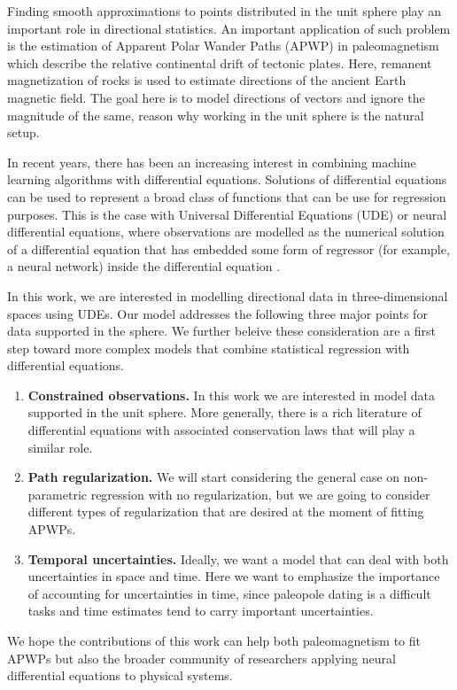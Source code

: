 Finding smooth approximations to points distributed in the unit sphere play an important role in directional statistics. 
An important application of such problem is the estimation of Apparent Polar Wander Paths (APWP) in paleomagnetism which describe the relative continental drift of tectonic plates.
Here, remanent magnetization of rocks is used to estimate directions of the ancient Earth magnetic field. 
The goal here is to model directions of vectors and ignore the magnitude of the same, reason why working in the unit sphere is the natural setup. 

In recent years, there has been an increasing interest in combining machine learning algorithms with differential equations. 
Solutions of differential equations can be used to represent a broad class of functions that can be use for regression purposes. 
This is the case with Universal Differential Equations (UDE) or neural differential equations, where observations are modelled as the numerical solution of a differential equation that has embedded some form of regressor (for example, a neural network) inside the differential equation \cite{rackauckas2020universal}.  

In this work, we are interested in modelling directional data in three-dimensional spaces using UDEs. 
Our model addresses the following three major points for data supported in the sphere. 
We further beleive these consideration are a first step toward more complex models that combine statistical regression with differential equations. 
\begin{enumerate}
    \item \textbf{Constrained observations.} In this work we are interested in model data supported in the unit sphere. More generally, there is a rich literature of differential equations with associated conservation laws that will play a similar role. 
    \item \textbf{Path regularization.} We will start considering the general case on non-parametric regression with no regularization, but we are going to consider different types of regularization that are desired at the moment of fitting APWPs.
    \item \textbf{Temporal uncertainties.} Ideally, we want a model that can deal with both uncertainties in space and time. Here we want to emphasize the importance of accounting for uncertainties in time, since paleopole dating is a difficult tasks and time estimates tend to carry important uncertainties. 
\end{enumerate}
We hope the contributions of this work can help both paleomagnetism to fit APWPs but also the broader community of researchers applying neural differential equations to physical systems. 


